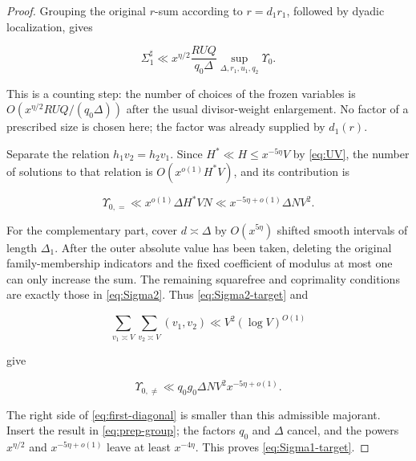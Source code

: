 \begin{proof}
Grouping the original $r$-sum according to $r=d_1r_1$, followed by dyadic
localization, gives

\begin{equation}\label{eq:prep-group}
 \Sigma_1^\sharp
 \ll x^{\eta/2}\frac{RUQ}{q_0\Delta}
 \sup_{\Delta,r_1,u_1,q_2}\Upsilon_0.
\end{equation}

This is a counting step: the number of choices of the frozen variables is
$O(x^{\eta/2}RUQ/(q_0\Delta))$ after the usual divisor-weight
enlargement.  No factor of a prescribed size is chosen here; the factor was
already supplied by $d_1(r)$.

Separate the relation $h_1v_2=h_2v_1$.  Since
$H^*\ll H\le x^{-5\eta}V$ by \cref{eq:UV}, the number of solutions to that
relation is $O(x^{o(1)}H^*V)$, and its contribution is

\begin{equation}\label{eq:first-diagonal}
 \Upsilon_{0,=}
 \ll x^{o(1)}\Delta H^*VN
 \ll x^{-5\eta+o(1)}\Delta NV^2.
\end{equation}

For the complementary part, cover $d\asymp\Delta$ by
$O(x^{5\eta})$ shifted smooth intervals of length $\Delta_1$.  After the
outer absolute value has been taken, deleting the original family-membership
indicators and the fixed coefficient of modulus at most one can only increase
the sum.  The remaining squarefree and coprimality conditions are exactly
those in \cref{eq:Sigma2}.  Thus \cref{eq:Sigma2-target} and

\begin{equation}\label{eq:gcd-v-average}
 \sum_{v_1\asymp V}\sum_{v_2\asymp V}(v_1,v_2)
 \ll V^2(\log V)^{O(1)}
\end{equation}

give

\[
 \Upsilon_{0,\ne}
 \ll q_0g_0\Delta NV^2x^{-5\eta+o(1)}.
\]

The right side of \cref{eq:first-diagonal} is smaller than this admissible
majorant.  Insert the result in \cref{eq:prep-group}; the factors $q_0$ and
$\Delta$ cancel, and the powers $x^{\eta/2}$ and
$x^{-5\eta+o(1)}$ leave at least $x^{-4\eta}$.  This proves
\cref{eq:Sigma1-target}.
\end{proof}

